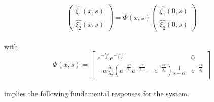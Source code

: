 \documentclass[preprint]{elsarticle}
\begin{document}
\[
\left(\begin{array}{c}
\widehat{\xi_{1}}\left(x,s\right)\\
\widehat{\xi_{2}}\left(x,s\right)
\end{array}\right)=\Phi\left(x,s\right)\left(\begin{array}{c}
\widehat{\xi_{1}}\left(0,s\right)\\
\widehat{\xi_{2}}\left(0,s\right)
\end{array}\right)
\]
\\
with 
\[
\Phi\left(x,s\right)=\left[\begin{array}{cc}
e^{-\frac{sx}{\lambda_{1}}}e^{-\frac{x}{\lambda_{1}\tau}} & 0\\
-\alpha\frac{\lambda_{1}}{\lambda_{2}}\left(e^{-\frac{sx}{\lambda_{1}}}e^{-\frac{x}{\lambda_{1}\tau}}-e^{-\frac{sx}{\lambda_{2}}}\right)\frac{1}{s+\alpha} & e^{-\frac{sx}{\lambda_{2}}}
\end{array}\right]
\]
\\
implies the following fundamental responses for the system.
\end{document}
